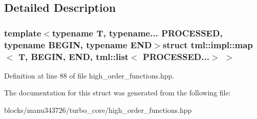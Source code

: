 \subsection{Detailed Description}
\subsubsection*{template$<$typename T, typename... P\+R\+O\+C\+E\+S\+S\+E\+D, typename B\+E\+G\+I\+N, typename E\+N\+D$>$struct tml\+::impl\+::map$<$ T, B\+E\+G\+I\+N, E\+N\+D, tml\+::list$<$ P\+R\+O\+C\+E\+S\+S\+E\+D...$>$ $>$}



Definition at line 88 of file high\+\_\+order\+\_\+functions.\+hpp.



The documentation for this struct was generated from the following file\+:\begin{DoxyCompactItemize}
\item 
blocks/manu343726/turbo\+\_\+core/high\+\_\+order\+\_\+functions.\+hpp\end{DoxyCompactItemize}
